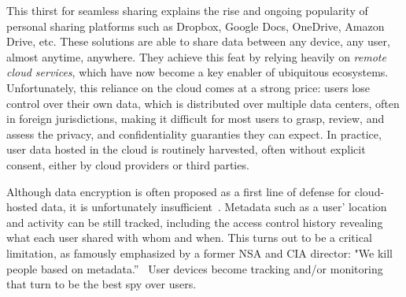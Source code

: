 This thirst for seamless sharing explains the rise and ongoing popularity
of personal sharing platforms such as Dropbox, Google Docs,
OneDrive, Amazon Drive, etc. These solutions are able to share data between any device, any user, almost
anytime, anywhere. They achieve this feat by relying heavily on
\emph{remote cloud services}, which have now become a key enabler of ubiquitous ecosystems. 
Unfortunately, this reliance on the cloud comes at a strong price: 
users lose control over their own data, which is distributed over
multiple data centers, often in foreign jurisdictions, making it difficult for most users to grasp, review, and assess the privacy, and
confidentiality guaranties they can expect. In practice, user data hosted in the cloud is routinely harvested, often without explicit
consent, either by cloud providers or third parties.

Although data encryption is often proposed as a first line of defense for cloud-hosted data, it is unfortunately  insufficient~\cite{granick_2017, HooffLZZ15, HarnikPS10}. Metadata such as a user'
location and activity can be still tracked, including the access
control history revealing what each user shared with whom and when. 
This turns out to be a critical limitation, as famously emphasized by a former NSA and CIA director: "We kill people based on metadata.''~\cite{NaughtonTheGuardian2016} 
User devices become tracking and/or monitoring \squad that turn to
be the best spy over users. 

